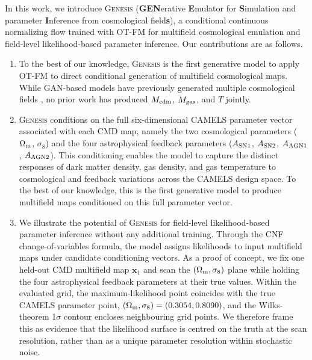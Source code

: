 \documentclass[usenatbib]{mnras}
\newcommand{\Mcdm}{M_{\rm cdm}}
\newcommand{\Mgas}{M_{\rm gas}}
\newcommand{\Tgas}{T}
\newcommand{\Om}{\Omega_{\rm m}}
\newcommand{\sig}{\sigma_8}
\begin{document}
In this work, we introduce \textsc{Genesis}
(\textbf{GEN}erative \textbf{E}mulator for
\textbf{S}imulation and parameter \textbf{I}nference from cosmological field\textbf{s}),
a conditional continuous normalizing flow trained with OT-FM for
multifield cosmological emulation and field-level likelihood-based
parameter inference. Our contributions are as follows.
\begin{enumerate}[label=\arabic*., leftmargin=*, labelsep=0.5em]
  \item To the best of our knowledge, \textsc{Genesis} is the first
        generative model to apply OT-FM to direct conditional
        generation of multifield cosmological maps.
        While GAN-based models have previously generated multiple
        cosmological fields \citep{Andrianomena2022,Andrianomena2024},
        no prior work has produced $\Mcdm$,
        $\Mgas$, and $\Tgas$ jointly.

  \item \textsc{Genesis} conditions on the full six-dimensional
        CAMELS parameter vector associated with each CMD map, namely
        the two cosmological parameters ($\Om$, $\sig$) and the four
        astrophysical feedback parameters
        ($A_{\rm SN1}$, $A_{\rm SN2}$, $A_{\rm AGN1}$, $A_{\rm AGN2}$).
        This conditioning enables the model to capture the distinct
        responses of dark matter density, gas density, and gas
        temperature to cosmological and feedback variations across the
        CAMELS design space. To the best of our knowledge, this is the
        first generative model to produce multifield maps conditioned 
        on this full parameter vector.

  \item We illustrate the potential of \textsc{Genesis} for
        field-level likelihood-based parameter inference without any
        additional training. Through the CNF change-of-variables
        formula, the model assigns likelihoods to input multifield maps
        under candidate conditioning vectors. As a proof of concept,
        we fix one held-out CMD multifield map $\mathbf{x}_1$ and scan
        the $(\Om,\sig)$ plane while holding the four astrophysical
        feedback parameters at their true values. Within the evaluated
        grid, the maximum-likelihood point coincides with the true
        CAMELS parameter point, $(\Om,\sig)=(0.3054,0.8090)$, and the
        Wilks-theorem 1$\sigma$ contour encloses neighbouring grid
        points. We therefore frame this as evidence that the likelihood
        surface is centred on the truth at the scan resolution, rather
        than as a unique parameter resolution within stochastic noise.
\end{enumerate}
\end{document}
